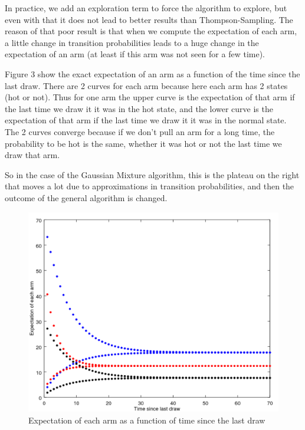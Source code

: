 \documentclass{article} %
\begin{document}
In practice, we add an exploration term to force the algorithm to explore, but even with that it does not lead to better results than Thompson-Sampling. The reason of that poor result is that when we compute the expectation of each arm, a little change in transition probabilities leads to a huge change in the expectation of an arm (at least if this arm was not seen for a few time).

Figure 3 show the exact expectation of an arm as a function of the time since the last draw. There are 2 curves for each arm because here each arm has 2 states (hot or not). Thus for one arm the upper curve is the expectation of that arm if the last time we draw it it was in the hot state, and the lower curve is the expectation of that arm if the last time we draw it it was in the normal state. The 2 curves converge because if we don't pull an arm for a long time, the probability to be hot is the same, whether it was hot or not the last time we draw that arm.

So in the case of the Gaussian Mixture algorithm, this is the plateau on the right that moves a lot due to approximations in transition probabilities, and then the outcome of the general algorithm is changed.

\begin{figure}[h]
	\begin{center}
		\includegraphics[width=1.0\textwidth]{expectations.png}
	\end{center}
	\caption{Expectation of each arm as a function of time since the last draw}
\end{figure}
\end{document}
